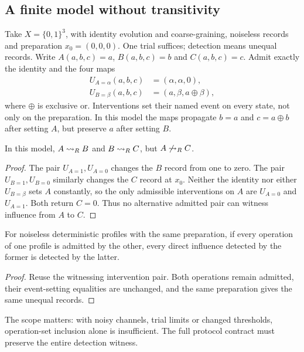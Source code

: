 \subsection{A finite model without transitivity}\label{sec:finite-model}

Take $X=\{0,1\}^3$, with identity evolution and coarse-graining,
noiseless records and preparation $x_0=(0,0,0)$. One trial suffices;
detection means unequal records. Write $A(a,b,c)=a$, $B(a,b,c)=b$
and $C(a,b,c)=c$. Admit exactly the identity and the four maps
\begin{align}
 U_{A=\alpha}(a,b,c)&=(\alpha,\alpha,0),\label{eq:model-int-a}\\
 U_{B=\beta}(a,b,c)&=(a,\beta,a\oplus\beta),\label{eq:model-int-b}
\end{align}
where $\oplus$ is exclusive or. Interventions set their named event
on every state, not only on the preparation. In this model the maps
propagate $b=a$ and $c=a\oplus b$ after setting $A$, but preserve
$a$ after setting $B$.

\begin{theorem}
\label{thm:influence-nontransitivity}
In this model, $A\rightsquigarrow_{R} B$ and $B\rightsquigarrow_{R} C$, but
$A\not\rightsquigarrow_{R} C$.
\end{theorem}
\begin{proof}
The pair $U_{A=1},U_{A=0}$ changes the $B$ record from one to zero.
The pair $U_{B=1},U_{B=0}$ similarly changes the $C$ record at $x_0$.
Neither the identity nor either $U_{B=\beta}$ sets $A$ constantly,
so the only admissible interventions on $A$ are $U_{A=0}$ and
$U_{A=1}$. Both return $C=0$. Thus no alternative admitted pair
can witness influence from $A$ to $C$.
\end{proof}

\begin{theorem}
\label{thm:influence-monotonicity}
For noiseless deterministic profiles with the same preparation, if
every operation of one profile is admitted by the other, every
direct influence detected by the former is detected by the latter.
\end{theorem}
\begin{proof}
Reuse the witnessing intervention pair. Both operations remain admitted,
their event-setting equalities are unchanged, and the same preparation
gives the same unequal records.
\end{proof}
The scope matters: with noisy channels, trial limits or changed
thresholds, operation-set inclusion alone is insufficient. The full
protocol contract must preserve the entire detection witness.
